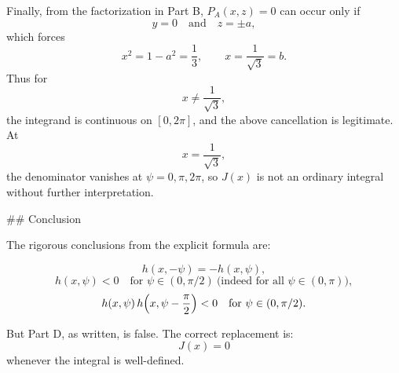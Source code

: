 Finally, from the factorization in Part B, \(P_A(x,z)=0\) can occur only if
\[
y=0\quad\text{and}\quad z=\pm a,
\]
which forces
\[
x^2=1-a^2=\frac13,\qquad x=\frac1{\sqrt3}=b.
\]
Thus for
\[
x\neq \frac1{\sqrt3},
\]
the integrand is continuous on \([0,2\pi]\), and the above cancellation is legitimate. At
\[
x=\frac1{\sqrt3},
\]
the denominator vanishes at \(\psi=0,\pi,2\pi\), so \(J(x)\) is not an ordinary integral without further interpretation.

## Conclusion

The rigorous conclusions from the explicit formula are:

\[
h(x,-\psi)=-h(x,\psi),
\]
\[
h(x,\psi)<0\quad\text{for }\psi\in(0,\pi/2)\ \text{(indeed for all }\psi\in(0,\pi)\text{)},
\]
\[
h(x,\psi)\,h\Bigl(x,\psi-\frac{\pi}{2}\Bigr)<0\quad\text{for }\psi\in(0,\pi/2).
\]

But Part D, as written, is false. The correct replacement is:
\[
J(x)=0
\]
whenever the integral is well-defined.